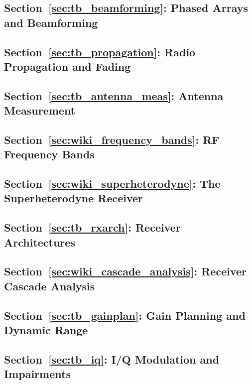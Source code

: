 
\subsection*{Section~\ref{sec:tb_beamforming}: Phased Arrays and Beamforming}

\subsection*{Section~\ref{sec:tb_propagation}: Radio Propagation and Fading}

\subsection*{Section~\ref{sec:tb_antenna_meas}: Antenna Measurement}

\subsection*{Section~\ref{sec:wiki_frequency_bands}: RF Frequency Bands}

\subsection*{Section~\ref{sec:wiki_superheterodyne}: The Superheterodyne Receiver}

\subsection*{Section~\ref{sec:tb_rxarch}: Receiver Architectures}

\subsection*{Section~\ref{sec:wiki_cascade_analysis}: Receiver Cascade Analysis}

\subsection*{Section~\ref{sec:tb_gainplan}: Gain Planning and Dynamic Range}

\subsection*{Section~\ref{sec:tb_iq}: I/Q Modulation and Impairments}
